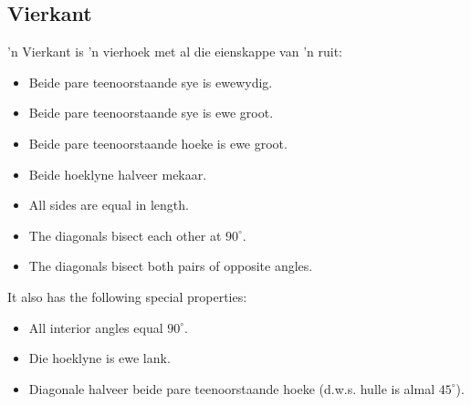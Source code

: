 \subsection{Vierkant}
'n Vierkant is 'n vierhoek met al die eienskappe van 'n ruit:

\begin{itemize}[noitemsep]
\item Beide pare teenoorstaande sye is ewewydig.
\item Beide pare teenoorstaande sye is ewe groot.

\item Beide pare teenoorstaande hoeke is ewe groot.
\item Beide hoeklyne halveer mekaar.
\item All sides are equal in length.
\item The diagonals bisect each other at ${90}^{\circ}$.
\item The diagonals bisect both pairs of opposite angles.
\end{itemize}
It also has the following special properties:
\begin{itemize}[noitemsep]
\item All interior angles equal ${90}^{\circ}$.
\item Die hoeklyne is ewe lank.
\item Diagonale halveer beide pare teenoorstaande hoeke (d.w.s. hulle is almal ${45}^{\circ }$).
\end{itemize}

